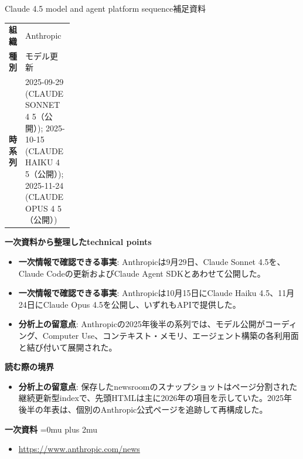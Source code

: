 \begin{technicalnote}{Claude 4.5 model and agent platform sequence}{補足資料}
\begingroup
\begin{tabularx}{\linewidth}{@{}>{\bfseries}p{0.22\linewidth}X@{}}
組織 & Anthropic \\
種別 & モデル更新 \\
時系列 & 2025-09-29 (CLAUDE SONNET 4 5（公開）); 2025-10-15 (CLAUDE HAIKU 4 5（公開）); 2025-11-24 (CLAUDE OPUS 4 5（公開）) \\
\end{tabularx}
\smallskip
{\bfseries 一次資料から整理したtechnical points}
\begin{itemize}[leftmargin=1.5em,itemsep=0.35em]
\item \textbf{一次情報で確認できる事実}: Anthropicは9月29日、Claude Sonnet 4.5を、Claude Codeの更新およびClaude Agent SDKとあわせて公開した。
\item \textbf{一次情報で確認できる事実}: Anthropicは10月15日にClaude Haiku 4.5、11月24日にClaude Opus 4.5を公開し、いずれもAPIで提供した。
\item \textbf{分析上の留意点}: Anthropicの2025年後半の系列では、モデル公開がコーディング、Computer Use、コンテキスト・メモリ、エージェント構築の各利用面と結び付いて展開された。
\end{itemize}
\begin{minipage}{\linewidth}
{\bfseries 読む際の境界}
\begin{itemize}[leftmargin=1.5em,itemsep=0.35em]
\item \textbf{分析上の留意点}: 保存したnewsroomのスナップショットはページ分割された継続更新型indexで、先頭HTMLは主に2026年の項目を示していた。2025年後半の年表は、個別のAnthropic公式ページを追跡して再構成した。
\end{itemize}
\begin{samepage}
{\bfseries 一次資料}
\begingroup\sloppy
\Urlmuskip=0mu plus 2mu\relax
\begin{itemize}[leftmargin=1.5em,itemsep=0.25em]
\item {\scriptsize\url{https://www.anthropic.com/news}}
\end{itemize}
\endgroup
\end{samepage}
\end{minipage}
\endgroup
\end{technicalnote}
\medskip

